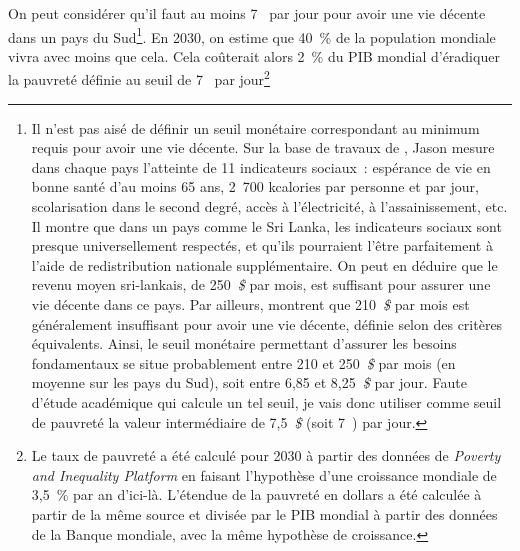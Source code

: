\documentclass[a5paper,french,openany]{memoir}
\begin{document}
On peut considérer qu'il faut au moins 7~\textit{\texteuro{}} par jour pour avoir une vie décente dans un pays du Sud\footnote{Il n'est pas aisé %
de définir un seuil monétaire correspondant au minimum requis pour avoir une vie décente. Sur la base de travaux de \cite{oneill_good_2018}, Jason \cite{hickel_is_2019} mesure dans chaque pays l'atteinte de 11 indicateurs sociaux~: espérance de vie en bonne santé d'au moins 65 ans, 2~700 kcalories par personne et par jour, scolarisation dans le second degré, accès à l'électricité, à l'assainissement, etc. Il montre que dans un pays comme le Sri Lanka, les indicateurs sociaux sont presque universellement respectés, et qu'ils pourraient l'être parfaitement à l'aide de redistribution nationale supplémentaire. On peut en déduire que le revenu moyen sri-lankais, de 250~\textit{\$} 
par mois, %
est suffisant pour assurer une vie décente dans ce pays. Par ailleurs, \cite{kikstra_decent_2021} montrent que 210~\textit{\$} par mois %
est généralement insuffisant pour avoir une vie décente, définie selon des critères équivalents. Ainsi, le seuil monétaire permettant d'assurer les besoins fondamentaux se situe probablement entre 210 et 250~\textit{\$} par mois (en moyenne sur les pays du Sud), soit entre 6,85 et 8,25~\textit{\$} par jour. Faute d'étude académique qui calcule un tel seuil, je vais donc utiliser comme seuil de pauvreté la valeur intermédiaire de 7,5~\textit{\$} (soit 7~\textit{\texteuro{}}) par jour.}. 
En 2030, on estime que 40~\% de la population mondiale vivra avec moins que cela. %
Cela coûterait alors 2~\% %
du PIB mondial d'éradiquer la pauvreté définie au seuil de 7~\textit{\texteuro{}} par jour\footnote{Le taux de pauvreté a été calculé pour 2030 à partir des données de \textit{Poverty and Inequality Platform} en faisant l'hypothèse d'une croissance mondiale de 3,5~\% par an d'ici-là. L'étendue de la pauvreté en dollars a été calculée à partir de la même source et divisée par le PIB mondial à partir des données de la Banque mondiale, avec la même hypothèse de croissance.}%
\end{document}
